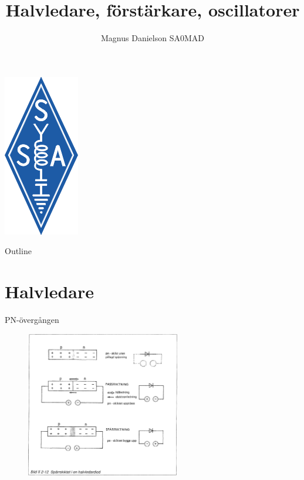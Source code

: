\documentclass{beamer}
\title{Halvledare, förstärkare, oscillatorer}
\author{Magnus Danielson SA0MAD}
\begin{document}
\begin{frame}
\titlepage
\includegraphics[height=0.3\textheight]{images/ssalogo}
\end{frame}

\begin{frame}{Outline}
\tableofcontents
\end{frame}

\section{Halvledare}

\begin{frame}{PN-övergången}

\begin{figure}[h]
\includegraphics[width=0.6\textwidth]{images/bild_2_2-12}
\label{fig:BildII1-16}
\end{figure}
\end{frame}
\end{document}
